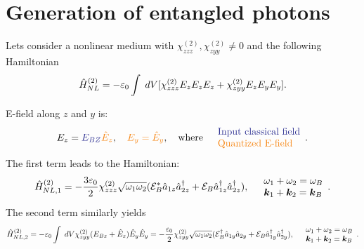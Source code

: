 \section{Generation of entangled photons}

Lets consider a nonlinear medium with $\chi_{zzz}^{(2)},\chi_{zyy}^{(2)}\neq0$ and the following Hamiltonian
\begin{align*}
    \hat{H}_{NL}^{(2)}=-\varepsilon_0\int\;dV[\chi_{zzz}^{(2)}E_zE_zE_z+\chi_{zyy}^{(2)}E_zE_yE_y].
\end{align*}

E-field along $z$ and $y$ is:
\begin{align*}
    E_z=\textcolor{Blue}{E_{BZ}}\textcolor{BurntOrange}{\hE_z},\quad\textcolor{BurntOrange}{E_y=\hE_y},\quad\text{where}\quad\begin{array}{l}
        \textcolor{Blue}{\text{Input classical field}}\\
        \textcolor{BurntOrange}{\text{Quantized E-field}}
    \end{array}.
\end{align*}
The first term leads to the Hamiltonian:
\begin{align}
    \hat{H}_{NL,1}^{(2)}=-\frac{3\varepsilon_0}{2}\chi_{zzz}^{(2)}\sqrt{\omega_1\omega_2}(\mathcal{E}_B^*\hat{a}_{1z}\hat{a}^\dagger_{2z}+\mathcal{E}_B\hat{a}_{1z}^\dagger\hat{a}_{2z}^\dagger),\quad\begin{array}{l}
        \omega_1+\omega_2=\omega_B\\
        \bm{k}_1+\bm{k}_2=\bm{k}_B
    \end{array}.
\end{align}
The second term similarly yields 
\begin{align*}
    \hat{H}_{NL,2}^{(2)}=-\varepsilon_0\int\;dV\chi_{zyy}^{(2)}(E_{Bz}+\hat{E}_z)\hat{E}_y\hat{E}_y=-\frac{\varepsilon_0}{2}\chi_{zyy}^{(2)}\sqrt{\omega_1\omega_2}(
        \mathcal{E}_B^\dagger\hat{a}_{1y}\hat{a}_{2y}+\mathcal{E}_B\hat{a}_{1y}^\dagger\hat{a}_{2y}^\dagger),\quad\begin{array}{l}
        \omega_1+\omega_2=\omega_B\\
        \bm{k}_1+\bm{k}_2=\bm{k}_B
    \end{array}.
\end{align*}

